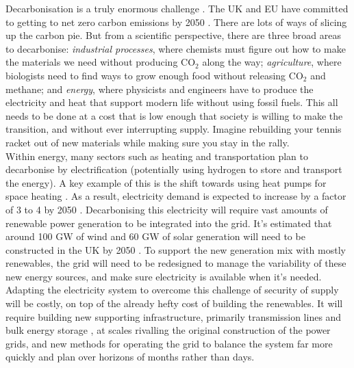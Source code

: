 \noindent
Decarbonisation is a truly enormous challenge . The UK and EU have committed to getting to net zero carbon emissions by 2050 .
There are lots of ways of slicing up the carbon pie. But from a scientific perspective, there are three broad areas to decarbonise: \textit{industrial processes}, where chemists must figure out how to make the materials we need without producing CO$_2$ along the way; \textit{agriculture}, where biologists need to find ways to grow enough food without releasing CO$_2$ and methane; and \textit{energy}, where physicists and engineers have to produce the electricity and heat that support modern life without using fossil fuels. This all needs to be done at a cost that is low enough that society is willing to make the transition, and without ever interrupting supply. Imagine rebuilding your tennis racket out of new materials while making sure you stay in the rally.\\

Within energy, many sectors such as heating and transportation plan to decarbonise by electrification (potentially using hydrogen to store and transport the energy). A key example of this is the shift towards using heat pumps for space heating .
As a result, electricity demand is expected to increase by a factor of 3 to 4 by 2050 . Decarbonising this electricity will require vast amounts of renewable power generation to be integrated into the grid. It's estimated that around 100 GW of wind and 60 GW of solar generation will need to be constructed in the UK by 2050 . To support the new generation mix with mostly renewables, the grid will need to be redesigned to manage the variability of these new energy sources, and make sure electricity is available when it's needed. Adapting the electricity system to overcome this challenge of security of supply  will be costly, on top of the already hefty cost of building the renewables. It will require building new supporting infrastructure, primarily transmission lines  and bulk energy storage , at scales rivalling the original construction of the power grids, and new methods for operating the grid to balance the system far more quickly and plan over horizons of months rather than days.

